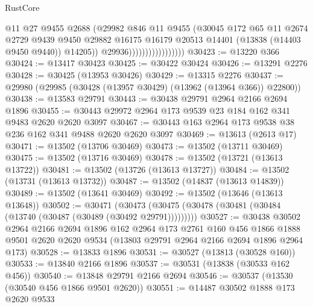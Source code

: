 \begin{lexlean}{RustCore}
\begin{coremodule}
                                      @11
                                      @27
                                      @9455
                                      @2688
                                      (@29982
                                        @846
                                        @11
                                        @9455
                                        (@30045
                                          @172
                                          @65
                                          @11
                                          @2674
                                          @2729
                                          @9439
                                          @9450
                                          @29882
                                          @16175
                                          @16179
                                          @20513
                                          @14401
                                          (@13838 (@14403 @9450 @9440))
                                          @14205))
                                      @29936)))))))))))))))))
@30423 := @13220 @366
@30424 := @13417 @30423
@30425 := @30422 @30424
@30426 := @13291 @2276
@30428 := @30425 (@13953 @30426)
@30429 := @13315 @2276
@30437 := @29980 (@29985 (@30428 (@13957 @30429) (@13962 (@13964 @366)) @22800))
@30438 := @13583 @29791
@30443 := @30438 @29791 @2964 @2166 @2694 @1896
@30455 := @30443 @29972 @2964 @173 @9539 @23 @184 @162 @341 @9483 @2620 @2620 @3097
@30467 := @30443 @163 @2964 @173 @9538 @38 @236 @162 @341 @9488 @2620 @2620 @3097
@30469 := @13613 (@2613 @17)
@30471 := @13502 (@13706 @30469)
@30473 := @13502 (@13711 @30469)
@30475 := @13502 (@13716 @30469)
@30478 := @13502 (@13721 (@13613 @13722))
@30481 := @13502 (@13726 (@13613 @13727))
@30484 := @13502 (@13731 (@13613 @13732))
@30487 := @13502 (@14837 (@13613 @14839))
@30489 := @13502 (@13641 @30469)
@30492 := @13502 (@13646 (@13613 @13648))
@30502 := @30471
    (@30473 (@30475 (@30478 (@30481 (@30484 (@13740 (@30487 (@30489 (@30492 @29791)))))))))
@30527 := @30438
    @30502
    @2964
    @2166
    @2694
    @1896
    @162
    @2964
    @173
    @2761
    @160
    @456
    @1866
    @1888
    @9501
    @2620
    @2620
    @9534
    (@13803 @29791 @2964 @2166 @2694 @1896 @2964 @173)
@30528 := @13833 @1896
@30531 := @30527 (@13813 (@30528 @160))
@30533 := @13840 @2166 @1896
@30537 := @30531 (@13838 (@30533 @162 @456))
@30540 := @13848 @29791 @2166 @2694
@30546 := @30537 (@13530 (@30540 @456 @1866 @9501 @2620))
@30551 := @14487 @30502 @1888 @173 @2620 @9533

\end{coremodule}
\end{lexlean}
